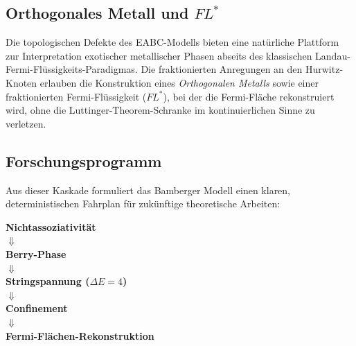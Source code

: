 \documentclass[11pt,a4paper]{article}
\begin{document}
\subsection{Orthogonales Metall und $FL^*$}
Die topologischen Defekte des EABC-Modells bieten eine natürliche Plattform zur Interpretation exotischer metallischer Phasen abseits des klassischen Landau-Fermi-Flüssigkeits-Paradigmas. Die fraktionierten Anregungen an den Hurwitz-Knoten erlauben die Konstruktion eines \textit{Orthogonalen Metalls} sowie einer fraktionierten Fermi-Flüssigkeit ($FL^*$), bei der die Fermi-Fläche rekonstruiert wird, ohne die Luttinger-Theorem-Schranke im kontinuierlichen Sinne zu verletzen.

\subsection{Forschungsprogramm}
Aus dieser Kaskade formuliert das Bamberger Modell einen klaren, deterministischen Fahrplan für zukünftige theoretische Arbeiten:
\begin{center}
	\textbf{Nichtassoziativität} \\
	$\Downarrow$ \\
	\textbf{Berry-Phase} \\
	$\Downarrow$ \\
	\textbf{Stringspannung ($\Delta E = 4$)} \\
	$\Downarrow$ \\
	\textbf{Confinement} \\
	$\Downarrow$ \\
	\textbf{Fermi-Flächen-Rekonstruktion}
\end{center}
\end{document}

